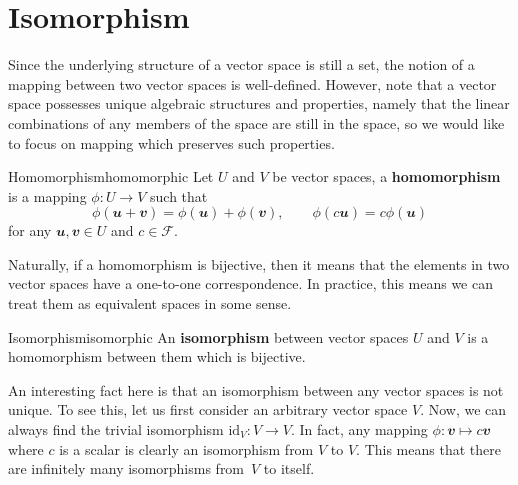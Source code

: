 \documentclass[math, code]{amznotes}
\theoremstyle{remark}
\begin{document}
\section{Isomorphism}
Since the underlying structure of a vector space is still a set, the notion of a mapping between two vector spaces is well-defined. However, note that a vector space possesses unique algebraic structures and properties, namely that the linear combinations of any members of the space are still in the space, so we would like to focus on mapping which preserves such properties.
\begin{dfnbox}{Homomorphism}{homomorphic}
    Let $U$ and $V$ be vector spaces, a {\color{red} \textbf{homomorphism}} is a mapping $\phi \colon U \to V$ such that
    \begin{equation*}
        \phi(\mathbfit{u + v}) = \phi(\mathbfit{u}) + \phi(\mathbfit{v}), \qquad \phi(c\mathbfit{u}) = c\phi(\mathbfit{u})
    \end{equation*}
    for any $\mathbfit{u}, \mathbfit{v} \in U$ and $c \in \mathcal{F}$.
\end{dfnbox}
Naturally, if a homomorphism is bijective, then it means that the elements in two vector spaces have a one-to-one correspondence. In practice, this means we can treat them as equivalent spaces in some sense.
\begin{dfnbox}{Isomorphism}{isomorphic}
    An {\color{red} \textbf{isomorphism}} between vector spaces $U$ and $V$ is a homomorphism between them which is bijective.
\end{dfnbox}
An interesting fact here is that an isomorphism between any vector spaces is not unique. To see this, let us first consider an arbitrary vector space $V$. Now, we can always find the trivial isomorphism $\mathrm{id}_V \colon V \to V$. In fact, any mapping $\phi \colon \mathbfit{v} \mapsto c\mathbfit{v}$ where $c$ is a scalar is clearly an isomorphism from $V$ to $V$. This means that there are infinitely many isomorphisms from~$V$ to itself.
\end{document}
